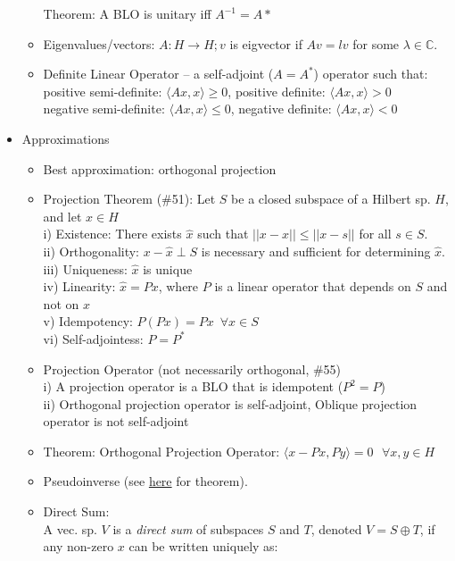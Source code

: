 \documentclass{article}
\newcommand{\la}{\langle}
\newcommand{\ra}{\rangle}
\begin{document}
\begin{itemize}
\begin{itemize}
	Theorem: A BLO is unitary iff $A^{-1}=A*$
	\item Eigenvalues/vectors: $A: H\rightarrow H; v $ is eigvector if $Av=lv$ for some $\lambda \in \mathbb{C}$.
	\item Definite Linear Operator -- a self-adjoint ($A=A^{*}$) operator such that: \\
	{\footnotesize \color{gray}
	positive semi-definite: $\la Ax, x \ra \ge 0$, positive definite: $\la Ax, x \ra > 0$ \\
	negative semi-definite: $\la Ax, x \ra \le 0$, negative definite: $\la Ax, x \ra < 0$
	}
	\end{itemize}
	\item Approximations
	\begin{itemize}
		\item Best approximation: orthogonal projection
		\item Projection Theorem (\#51): Let $S$ be a closed subspace of a Hilbert sp. $H$, and let $x \in H$ \\
		{\footnotesize \color{gray}
			i) Existence: There exists $\hat{x}$ such that $||x-\hat{x}||\le ||x-s||$ for all $s \in S$.	\\
			ii) Orthogonality: $x-\hat{x}\perp S$ is necessary and sufficient for determining $\hat{x}$.\\
			iii) Uniqueness: $\hat{x}$ is unique\\
			iv) Linearity: 	$\hat{x}=Px$, where $P$ is a linear operator that depends on $S$ and not on $x$\\
			v) Idempotency: $P(Px)=Px\,\,\,\forall x \in S$ \\
			vi) Self-adjointess: $P=P^{*}$
		}
	\item Projection Operator (not necessarily orthogonal, \#55) \\
	{\footnotesize \color{gray}
	i) A projection operator is a BLO that is idempotent ($P^2=P$) \\
	ii) Orthogonal projection operator is self-adjoint,  Oblique projection operator is not self-adjoint
	}
	\item Theorem: Orthogonal Projection Operator: $\la x-Px, Py\ra = 0\,\,\,\, \forall x,y\in H$
	\item Pseudoinverse (see \hyperref[pseudoinv]{here} for theorem).
	\item Direct Sum: \\
	{\footnotesize\color{gray}A vec. sp. $V$ is a \textit{direct sum} of subspaces $S$ and $T$, denoted $V=S\oplus T$, if any non-zero $x$ can be written uniquely as: \\
}
\end{itemize}
\end{itemize}
\end{document}
